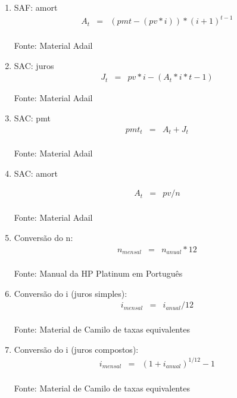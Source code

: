 \documentclass[a4paper,10pt]{article}
\begin{document}
\begin{enumerate}
\item  SAF: amort 
\begin{eqnarray*}
 	A_{t} &=& (pmt - (pv*i)) * (i+1)^{t-1} \\	
\end{eqnarray*}
 
 Fonte: Material Adail

\item  SAC: juros 
\begin{eqnarray*}
 	J_{t} &=& pv*i - (A_{t}*i*t-1)	
\end{eqnarray*}
 
 Fonte: Material Adail 

\item  SAC: pmt
\begin{eqnarray*}
 	pmt_{t} &=& A_{t} + J_{t}	\\
\end{eqnarray*}
 
 Fonte: Material Adail

\item  SAC: amort 

\begin{eqnarray*}
 	A_{t} &=& pv / n \\	
\end{eqnarray*}
 
 Fonte: Material Adail

\item  Conversão do n:
\begin{eqnarray*}
 	n_{mensal} &=& n_{anual} * 12 \\	
\end{eqnarray*}
 
 Fonte: Manual da HP Platinum em Português

\item  Conversão do i (juros simples):
\begin{eqnarray*}
 	i_{mensal} &=& i_{anual} / 12 \\	
\end{eqnarray*}
  
 Fonte: Material de Camilo de taxas equivalentes

\item  Conversão do i (juros compostos):
\begin{eqnarray*}
 	i_{mensal} &=& (1+i_{anual})^{1/12} - 1 \\	
\end{eqnarray*}
 
 Fonte: Material de Camilo de taxas equivalentes

\end{enumerate}
\end{document}
